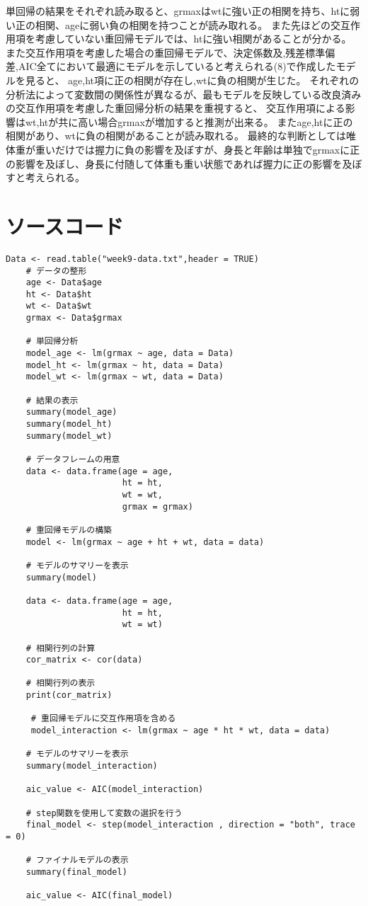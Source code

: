 \documentclass[fontsize = 8pt, paper= a4]{jlreq}
\begin{document}
単回帰の結果をそれぞれ読み取ると、grmaxはwtに強い正の相関を持ち、htに弱い正の相関、ageに弱い負の相関を持つことが読み取れる。
また先ほどの交互作用項を考慮していない重回帰モデルでは、htに強い相関があることが分かる。
また交互作用項を考慮した場合の重回帰モデルで、決定係数及,残差標準偏差,AIC全てにおいて最適にモデルを示していると考えられる(8)で作成したモデルを見ると、
age,ht項に正の相関が存在し,wtに負の相関が生じた。
それぞれの分析法によって変数間の関係性が異なるが、最もモデルを反映している改良済みの交互作用項を考慮した重回帰分析の結果を重視すると、
交互作用項による影響はwt,htが共に高い場合grmaxが増加すると推測が出来る。
またage,htに正の相関があり、wtに負の相関があることが読み取れる。
最終的な判断としては唯体重が重いだけでは握力に負の影響を及ぼすが、身長と年齢は単独でgrmaxに正の影響を及ぼし、身長に付随して体重も重い状態であれば握力に正の影響を及ぼすと考えられる。


\section{ソースコード}
\begin{lstlisting}[basicstyle=\ttfamily\footnotesize, frame=single]
    Data <- read.table("week9-data.txt",header = TRUE)
    # データの整形
    age <- Data$age
    ht <- Data$ht
    wt <- Data$wt
    grmax <- Data$grmax
    
    # 単回帰分析
    model_age <- lm(grmax ~ age, data = Data)
    model_ht <- lm(grmax ~ ht, data = Data)
    model_wt <- lm(grmax ~ wt, data = Data)
    
    # 結果の表示
    summary(model_age)
    summary(model_ht)
    summary(model_wt)
    
    # データフレームの用意
    data <- data.frame(age = age,
                       ht = ht,
                       wt = wt,
                       grmax = grmax)
    
    # 重回帰モデルの構築
    model <- lm(grmax ~ age + ht + wt, data = data)
    
    # モデルのサマリーを表示
    summary(model)
    
    data <- data.frame(age = age,
                       ht = ht,
                       wt = wt)
    
    # 相関行列の計算
    cor_matrix <- cor(data)
    
    # 相関行列の表示
    print(cor_matrix)
    
     # 重回帰モデルに交互作用項を含める
     model_interaction <- lm(grmax ~ age * ht * wt, data = data)
     
    # モデルのサマリーを表示
    summary(model_interaction)
    
    aic_value <- AIC(model_interaction)
    
    # step関数を使用して変数の選択を行う
    final_model <- step(model_interaction , direction = "both", trace = 0)
    
    # ファイナルモデルの表示
    summary(final_model)
    
    aic_value <- AIC(final_model)
\end{lstlisting}
\end{document}
